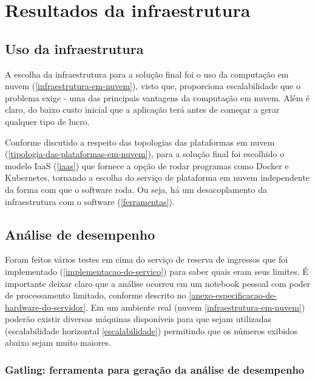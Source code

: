 \chapter{Resultados da infraestrutura}

\section{Uso da infraestrutura}

A escolha da infraestrutura para a solução final foi o uso da
computação em nuvem (\autoref{infraestrutura-em-nuvem}), visto que, proporciona
escalabilidade que o problema exige - uma das principais vantagens da computação em nuvem.
Além é claro, do baixo custo inicial que a aplicação terá antes de começar a gerar qualquer
tipo de lucro.

Conforme discutido a respeito das topologias das plataformas em
nuvem (\autoref{tipologia-das-plataformas-em-nuvem}), para a solução final foi escolhido o
modelo IaaS (\autoref{iaas}) que fornece a opção de rodar programas como Docker e
Kubernetes, tornando a escolha do serviço de plataforma em nuvem independente da forma
com que o software roda. Ou seja, há um desacoplamento da infraestrutura com o software
(\autoref{ferramentas}).

\section{Análise de desempenho}

Foram feitos vários testes em cima do serviço de reserva de ingressos que foi implementado
(\autoref{implementacao-do-servico}) para saber quais eram seus limites.
É importante deixar claro que a análise ocorreu em um notebook pessoal com poder
de processamento limitado, conforme descrito no
\autoref{anexo-especificacao-de-hardware-do-servidor}.
Em um ambiente real (nuvem \autoref{infraestrutura-em-nuvem})
poderão existir diversas máquinas disponíveis para que sejam utilizadas
(escalabilidade horizontal \autoref{escalabilidade})
permitindo que os números exibidos abaixo sejam muito maiores.

\subsection{Gatling: ferramenta para geração da análise de desempenho}

